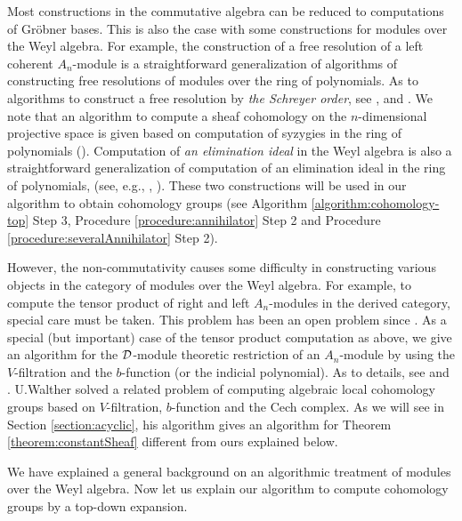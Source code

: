 \documentclass[12pt]{article}
\def\Dsc{ {\cal D} }
\begin{document}
Most constructions in the commutative algebra can be reduced to
computations of Gr\"obner bases.
This is also the case with some constructions for modules 
over the Weyl algebra.
For example,
the construction of a free resolution of a left coherent $A_n$-module 
is a straightforward generalization of algorithms of constructing 
free resolutions of modules over the ring of polynomials.
As to algorithms to construct a free resolution by {\it the Schreyer order},
see \cite[p.167 Theorem 3.7.13]{AdamsBook}, \cite[Theorem 15.10]{EisenbudBook}
and \cite{StillmanResolution}.
We note that 
 an algorithm to compute a sheaf
cohomology on the $n$-dimensional projective space is given
based on computation of syzygies in the ring of polynomials
(\cite{EisenbudCohomology}).
Computation of {\it an elimination ideal} in the Weyl algebra is also a 
straightforward generalization of computation of an elimination 
ideal in the ring of polynomials,
(see, e.g., \cite[p.69 Theorem 2.3.4]{AdamsBook},
\cite[p.114 Theorem 2]{CoxBook}).
These two constructions will be used in our algorithm to obtain
cohomology groups (see Algorithm \ref{algorithm:cohomology-top} Step 3,
Procedure \ref{procedure:annihilator} Step 2 
and Procedure \ref{procedure:severalAnnihilator} Step 2).

However, the non-commutativity 
causes some difficulty in constructing various objects in the category
of modules over the Weyl algebra.
For example, to compute
the tensor product of right and left $A_n$-modules in the derived category,
special care must be taken. 
This problem has been an open problem since \cite{TakayamaISSAC90}. 
As a special (but important) case of the tensor product computation as above, 
we give 
an algorithm for the $\Dsc$-module theoretic restriction of an $A_n$-module
by using the $V$-filtration and the $b$-function (or the indicial 
polynomial).  
As to details, see 
\cite[Proposition 5.2, Theorem 5.7, Algorithm 5.10]{OakuAdvance} 
and \cite{OakuAdvance2}.
U.Walther \cite{Walther} solved a related problem of computing 
algebraic local cohomology groups based on $V$-filtration, $b$-function
and the Cech complex.
As we will see in Section \ref{section:acyclic},
his algorithm gives an algorithm for 
Theorem \ref{theorem:constantSheaf} different from ours explained below.

We have explained a general background on an algorithmic
treatment of modules over the Weyl algebra.
Now let us  explain our algorithm to compute cohomology 
groups by a top-down expansion.
\end{document}
